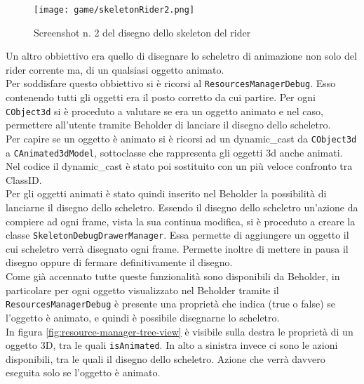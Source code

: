 	\begin{figure}[h!] 
		\centering 
		\hspace*{-0.05\columnwidth}\texttt{[image: game/skeletonRider2.png]} 
		\caption{Screenshot n. 2 del disegno dello skeleton del rider}
	\end{figure}
	
	Un altro obbiettivo era quello di disegnare lo scheletro di animazione non solo del rider corrente ma, di un qualsiasi oggetto animato.\\
	
	Per soddisfare questo obbiettivo si è ricorsi al \texttt{ResourcesManagerDebug}. Esso contenendo tutti gli oggetti era il posto corretto da cui partire. Per ogni \texttt{CObject3d} si è proceduto a valutare se era un oggetto animato e nel caso, permettere all'utente tramite Beholder di lanciare il disegno dello scheletro.\\
	
	Per capire se un oggetto è animato si è ricorsi ad un dynamic\_cast da \texttt{CObject3d} a \texttt{CAnimated3dModel}, sottoclasse che rappresenta gli oggetti 3d anche animati. Nel codice il dynamic\_cast è stato poi sostituito con un più veloce confronto tra ClassID.\\
	
	Per gli oggetti animati è stato quindi inserito nel Beholder la possibilità di lanciarne il disegno dello scheletro. Essendo il disegno dello scheletro un'azione da compiere ad ogni frame, vista la sua continua modifica, si è proceduto a creare la classe \texttt{SkeletonDebugDrawerManager}. Essa permette di aggiungere un oggetto il cui scheletro verrà disegnato ogni frame. Permette inoltre di mettere in pausa il disegno oppure di fermare definitivamente il disegno.\\
	
	Come già accennato tutte queste funzionalità sono disponibili da Beholder, in particolare per ogni oggetto visualizzato nel Beholder tramite il \texttt{ResourcesManagerDebug} è presente una proprietà che indica (true o false) se l'oggetto è animato, e quindi è possibile disegnarne lo scheletro.\\
	
	In figura \ref{fig:resource-manager-tree-view} è visibile sulla destra le proprietà di un oggetto 3D, tra le quali \texttt{isAnimated}. In alto a sinistra invece ci sono le azioni disponibili, tra le quali il disegno dello scheletro. Azione che verrà davvero eseguita solo se l'oggetto è animato.\\
	
